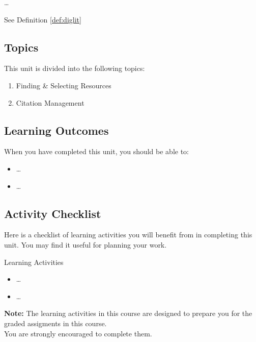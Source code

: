 \documentclass[
]{book}
\providecommand{\tightlist}{%
  \setlength{\itemsep}{0pt}\setlength{\parskip}{0pt}}
\theoremstyle{definition}
\theoremstyle{definition}
\theoremstyle{definition}
\theoremstyle{definition}
\theoremstyle{remark}
\begin{document}
\ldots{}

See Definition \ref{def:diglit}

\hypertarget{topics-1}{%
\subsection*{Topics}\label{topics-1}}

This unit is divided into the following topics:

\begin{enumerate}
\def\labelenumi{\arabic{enumi}.}
\tightlist
\item
  Finding \& Selecting Resources\\
\item
  Citation Management
\end{enumerate}

\hypertarget{learning-outcomes-1}{%
\subsection*{Learning Outcomes}\label{learning-outcomes-1}}

When you have completed this unit, you should be able to:

\begin{itemize}
\tightlist
\item
  \ldots{}
\item
  \ldots{}
\end{itemize}

\hypertarget{activity-checklist-1}{%
\subsection*{Activity Checklist}\label{activity-checklist-1}}

Here is a checklist of learning activities you will benefit from in completing this unit. You may find it useful for planning your work.

\begin{reflect}
{Learning Activities}

\begin{itemize}
\tightlist
\item
  \ldots{}
\item
  \ldots{}
\end{itemize}

\textbf{Note:} The learning activities in this course are designed to prepare you for the graded assigments in this course.\\
You are strongly encouraged to complete them.
\end{reflect}
\end{document}
